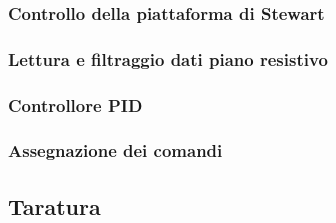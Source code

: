 \documentclass[11pt]{article}
\begin{document}
\subsubsection{Controllo della piattaforma di Stewart}
\subsubsection{Lettura e filtraggio dati piano resistivo}
\subsubsection{Controllore PID}
\subsubsection{Assegnazione dei comandi}

\subsection{Taratura}\label{taratura}
\end{document}
